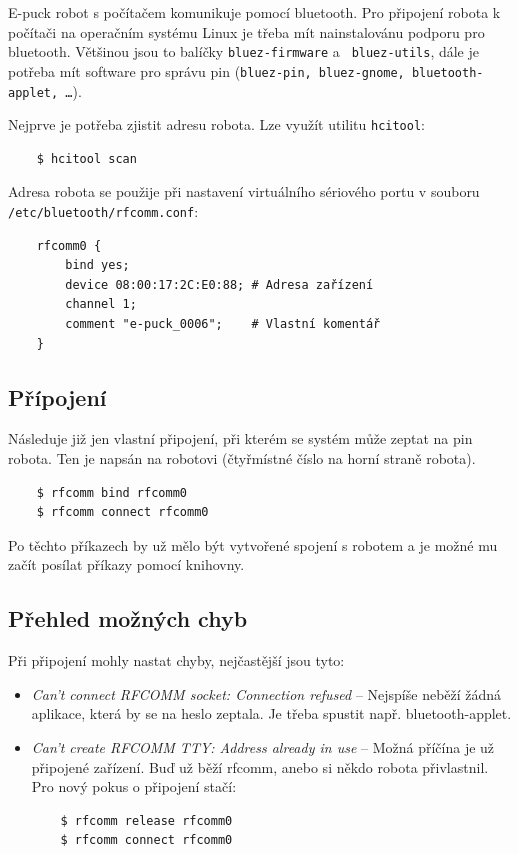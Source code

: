 \documentclass[12pt,notitlepage]{report}
\begin{document}
    E-puck robot s počítačem komunikuje pomocí bluetooth. Pro připojení robota
    k počítači na operačním systému Linux je třeba mít nainstalovánu podporu
    pro bluetooth. Většinou jsou to balíčky {\tt bluez-firmware} a {\tt
    bluez-utils}, dále je potřeba mít software pro správu pin ({\tt bluez-pin,
    bluez-gnome, bluetooth-applet, \ldots}).

    Nejprve je potřeba zjistit adresu robota. Lze využít utilitu {\tt hcitool}:

    \begin{verbatim}
    $ hcitool scan
    \end{verbatim}

    Adresa robota se použije při nastavení virtuálního sériového portu v souboru {\tt /etc/bluetooth/rfcomm.conf}:

    \begin{verbatim}
    rfcomm0 {
        bind yes;
        device 08:00:17:2C:E0:88; # Adresa zařízení
        channel 1;
        comment "e-puck_0006";    # Vlastní komentář
    }
    \end{verbatim}

    \subsection{Přípojení}
    Následuje již jen vlastní připojení, při kterém se systém může zeptat na
    pin robota. Ten je napsán na robotovi (čtyřmístné číslo na horní straně
    robota).

    \begin{verbatim}
    $ rfcomm bind rfcomm0
    $ rfcomm connect rfcomm0
    \end{verbatim}

    Po těchto příkazech by už mělo být vytvořené spojení s robotem a je možné
    mu začít posílat příkazy pomocí knihovny.

    \subsection{Přehled možných chyb}
    Při připojení mohly nastat chyby, nejčastější jsou tyto:
    \begin{itemize}
    \item{{\em Can't connect RFCOMM socket: Connection refused} -- Nejspíše neběží žádná aplikace, která by se na heslo zeptala. Je třeba spustit např. bluetooth-applet.}
    \item{{\em Can't create RFCOMM TTY: Address already in use} -- Možná příčína je už připojené zařízení. Buď už běží rfcomm, anebo si
        někdo robota přivlastnil. Pro nový pokus o připojení stačí:
            \begin{verbatim}
    $ rfcomm release rfcomm0
    $ rfcomm connect rfcomm0
            \end{verbatim}
    }
    \end{itemize}
\end{document}
